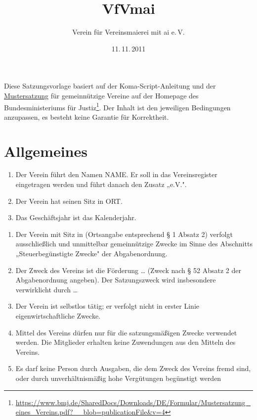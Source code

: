 \documentclass{scrartcl}
\begin{document}
\subject{Satzung}
\title{VfVmai}
\subtitle{Verein für Vereinsmaierei mit ai e.\,V.}
\date{11.\,11.\,2011}
\author{}
\maketitle

\tableofcontents

Diese Satzungsvorlage basiert auf der Koma-Script-Anleitung und der \href{https://www.bmj.de/SharedDocs/Downloads/DE/Formular/Mustersatzung_eines_Vereins.pdf?__blob=publicationFile&v=4}{Mustersatzung} für gemeinnützige Vereine auf der Homepage des Bundesministeriums für Justiz\footnote{\url{https://www.bmj.de/SharedDocs/Downloads/DE/Formular/Mustersatzung_eines_Vereins.pdf?__blob=publicationFile&v=4}}. Der Inhalt ist den jeweiligen Bedingungen anzupassen, es besteht keine Garantie für Korrektheit.


\appendix %

\section{Allgemeines}
\begin{contract}
\Clause[title={Name und Sitz des Vereins, Geschäftsjahr}]
\begin{enumerate}
    \item Der Verein führt den Namen NAME. Er soll in das Vereinsregister eingetragen werden und führt danach den Zusatz „e.V.".
    \item Der Verein hat seinen Sitz in ORT.
    \item Das Geschäftsjahr ist das Kalenderjahr.
\end{enumerate} 

\Clause[title={Zweck, Gemeinnützigkeit des Vereins}]
\begin{enumerate}
    \item Der Verein mit Sitz in (Ortsangabe entsprechend § 1 Absatz 2) verfolgt ausschließlich und unmittelbar gemeinnützige Zwecke im Sinne des Abschnitts „Steuerbegünstigte Zwecke" der Abgabenordnung.
    \item Der Zweck des Vereins ist die Förderung … (Zweck nach § 52 Absatz 2 der Abgabenordnung angeben). Der Satzungszweck wird insbesondere verwirklicht durch …
    \item Der Verein ist selbstlos tätig; er verfolgt nicht in erster Linie eigenwirtschaftliche Zwecke.
    \item Mittel des Vereins dürfen nur für die satzungsmäßigen Zwecke verwendet werden. Die Mitglieder erhalten keine Zuwendungen aus den Mitteln des Vereins.
    \item Es darf keine Person durch Ausgaben, die dem Zweck des Vereins fremd sind, oder durch unverhältnismäßig hohe Vergütungen begünstigt werden
\end{enumerate}

\end{contract}
\end{document}
